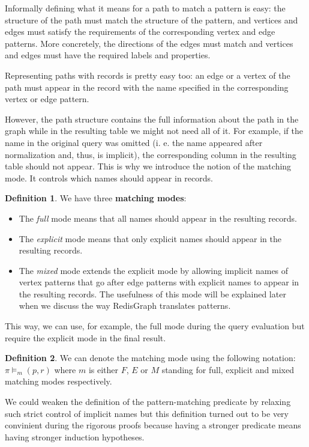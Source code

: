 \documentclass[14pt]{constructor-thesis}
\theoremstyle{definition}
\newtheorem*{definition}{Definition}
\begin{document}
Informally defining what it means for a path to match a pattern is easy: the structure of the path must match the structure of the pattern, and vertices and edges must satisfy the requirements of the corresponding vertex and edge patterns. More concretely, the directions of the edges must match and vertices and edges must have the required labels and properties.

Representing paths with records is pretty easy too: an edge or a vertex of the path must appear in the record with the name specified in the corresponding vertex or edge pattern.

However, the path structure contains the full information about the path in the graph while in the resulting table we might not need all of it. For example, if the name in the original query was omitted (i. e. the name appeared after normalization and, thus, is implicit), the corresponding column in the resulting table should not appear. This is why we introduce the notion of the matching mode. It controls which names should appear in records.

\begin{definition}
  We have three \textbf{matching modes}:
  \begin{itemize}
    \item The \textit{full} mode means that all names should appear in the resulting records.
    \item The \textit{explicit} mode means that only explicit names should appear in the resulting records.
    \item The \textit{mixed} mode extends the explicit mode by allowing implicit names of vertex patterns that go after edge patterns with explicit names to appear in the resulting records. The usefulness of this mode will be explained later when we discuss the way RedisGraph translates patterns.
  \end{itemize} 
\end{definition}

This way, we can use, for example, the full mode during the query evaluation but require the explicit mode in the final result.

\begin{definition}
  We can denote the matching mode using the following notation:
  $ \pi \models_m (p, r) $
  where $m$ is either $F$, $E$ or $M$ standing for full, explicit and mixed matching modes respectively.
\end{definition}

We could weaken the definition of the pattern-matching predicate by relaxing such strict control of implicit names but this definition turned out to be very convinient during the rigorous proofs because having a stronger predicate means having stronger induction hypotheses.
\end{document}
